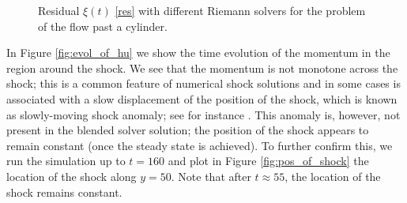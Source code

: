 \documentclass[preprint, 11pt]{article}
\begin{document}
\begin{figure}[!h]
  {\scriptsize
  }
  \caption{
    Residual $\xi(t)$ \eqref{res} with different Riemann solvers for the problem of the flow past a cylinder.
    \label{fig:residuals_cylinder}}
\end{figure}

In Figure \ref{fig:evol_of_hu} we show the time evolution of the momentum in the region around the shock.
We see that the momentum is not monotone across the shock; this is a common feature of numerical shock
solutions and in some cases is associated with a slow displacement of the position of the shock,
which is known as slowly-moving shock anomaly; see for instance \cite{navas2019improved, zaide2012numerical}.
This anomaly is, however, not present in the blended solver solution;
the position of the shock appears to remain constant (once the steady state
is achieved).
To further confirm this, we run the simulation up to $t=160$ and plot in
Figure \ref{fig:pos_of_shock} the location of the shock along $y=50$.
Note that after $t\approx 55$, the location of the shock remains constant.
  
\end{document}
